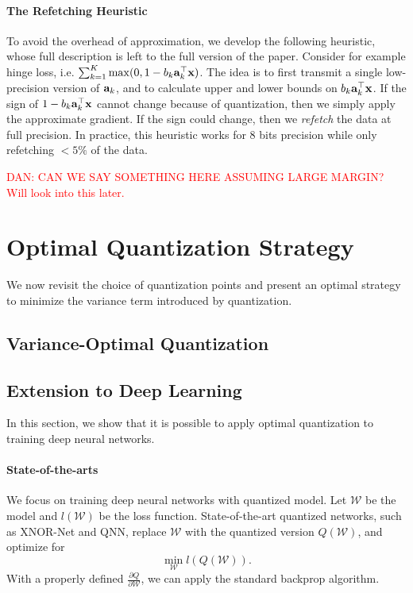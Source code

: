 \documentclass{article}
\def\a{{\bf a}}
\def\x{{\bf x}}
\begin{document}




\paragraph*{The Refetching Heuristic}
To avoid the overhead of approximation, we develop the following heuristic, whose full description is left to the full version of the paper. 
Consider for example hinge loss, i.e.  $\sum_{k=1}^K \max(0, 1 - b_k \a_k^\top \x)$. 
The idea is to 
first transmit a single low-precision version of $\a_k$, and to  
calculate upper and lower bounds on $b_k \a_k^\top \x$.
If the sign of $1-b_k \a_k^\top \x$ cannot change because of quantization, then we simply apply the approximate gradient. 
If the sign could change, then we {\em refetch} the data at full precision.
In practice, this heuristic works for 
8 bits precision while only refetching $<5\%$
of the data.

\textcolor{red}{DAN: CAN WE SAY SOMETHING HERE ASSUMING LARGE MARGIN?}
\textcolor{red}{Will look into this later.}

\section{Optimal Quantization Strategy} \label{sec:optimal}

We now revisit the choice of quantization points
and present an optimal strategy to minimize 
the variance term introduced by quantization.

\subsection{Variance-Optimal Quantization}



\subsection{Extension to Deep Learning}

In this section, we show that it is possible 
to apply optimal quantization to
training deep neural networks.

\paragraph*{State-of-the-arts} We focus on
training deep neural networks with quantized
model. Let $\mathcal{W}$ be the model and 
$l(\mathcal{W})$ be the loss function. State-of-the-art quantized networks,
such as XNOR-Net and QNN, replace $\mathcal{W}$
with the quantized version $Q(\mathcal{W})$, and optimize
for
\[
\min_{\mathcal{W}} l(Q(\mathcal{W})).
\]
With a properly defined 
$\frac{\partial Q}{\partial{\mathcal{W}}}$, we can
apply the standard backprop 
algorithm.
\end{document}
